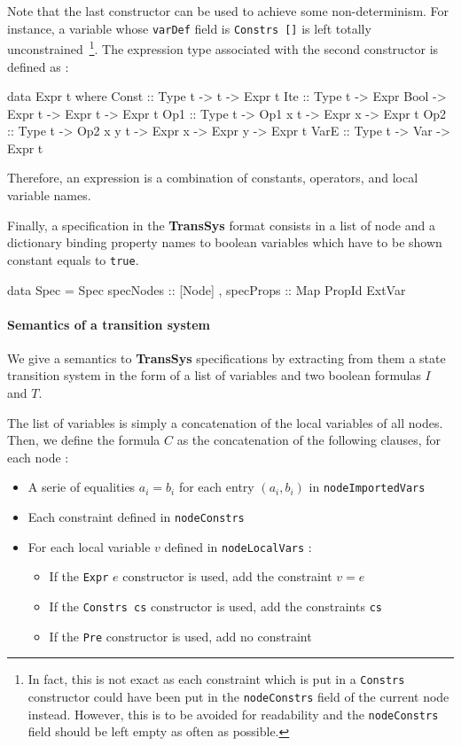 Note that the last constructor can be used to achieve some non-determinism. For instance, a variable whose \texttt{varDef} field is \texttt{Constrs []} is left totally unconstrained~\footnote{In fact, this is not exact as each constraint which is put in a \texttt{Constrs} constructor could have been put in the \texttt{nodeConstrs} field of the current node instead. However, this is to be avoided for readability and the \texttt{nodeConstrs} field should be left empty as often as possible.
}. The expression type associated with the second constructor is defined as :
\begin{code}
data Expr t where
  Const  :: Type t -> t -> Expr t
  Ite    :: Type t -> Expr Bool -> Expr t -> Expr t -> Expr t
  Op1    :: Type t -> Op1 x t -> Expr x -> Expr t
  Op2    :: Type t -> Op2 x y t -> Expr x -> Expr y -> Expr t
  VarE   :: Type t -> Var -> Expr t
\end{code}
Therefore, an expression is a combination of constants, operators, and local variable names.


Finally, a specification in the \textbf{TransSys} format consists in a list of node and a dictionary binding property names to boolean variables which have to be shown constant equals to \texttt{true}.
\begin{code}
data Spec = Spec
  { specNodes :: [Node]
  , specProps :: Map PropId ExtVar }
\end{code}


\paragraph{Semantics of a transition system}
We give a semantics to \textbf{TransSys} specifications by extracting from them a state transition system in the form of a list of variables and two boolean formulas $I$ and $T$. 

The list of variables is simply a concatenation of the local variables of all nodes. Then, we define the formula $C$ as the concatenation of the following clauses, for each node :


\begin{itemize}
\item A serie of equalities $a_i = b_i$ for each entry $(a_i, b_i)$ in \texttt{nodeImportedVars}
\item Each constraint defined in \texttt{nodeConstrs}
\item For each local variable $v$ defined in \texttt{nodeLocalVars} :

\begin{itemize}
\item If the \texttt{Expr} $e$ constructor is used, add the constraint $v = e$
\item If the \texttt{Constrs cs} constructor is used, add the constraints \texttt{cs} 
\item If the \texttt{Pre} constructor is used, add no constraint
\end{itemize}

\end{itemize}


